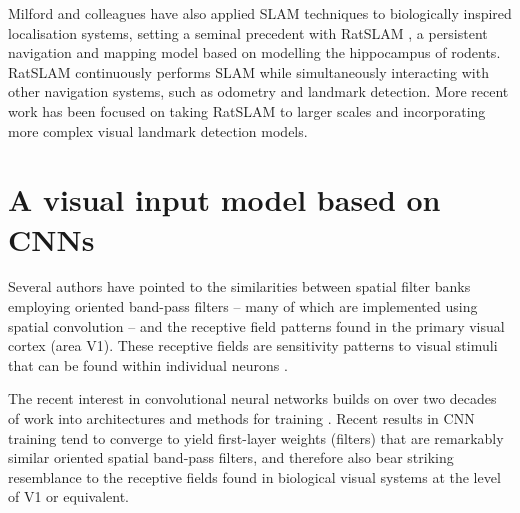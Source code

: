 Milford and colleagues have also applied SLAM techniques to biologically inspired localisation systems,  setting a seminal precedent with RatSLAM \cite{milford2004ratslam}, a persistent navigation and mapping model based on modelling the hippocampus of rodents. RatSLAM continuously performs SLAM while simultaneously interacting with other navigation systems, such as odometry and landmark detection. More recent work \cite{milford2012seqslam} has been focused on taking RatSLAM to larger scales and incorporating more complex visual landmark detection models. 


\section{A visual input model based on CNNs}
\label{sec:tensornotation}



Several authors have pointed to the similarities between spatial filter banks employing oriented band-pass filters \cite{wandell1995foundations, petrou2008next} -- many of which are implemented using spatial convolution -- and the receptive field patterns found in the primary visual cortex (area V1).  These receptive fields are sensitivity patterns to visual stimuli that can be found within individual neurons \cite{olshausen1997sparse,ringach2002spatial}. 

The recent interest in convolutional neural networks \cite{krizhevsky2012imagenet, ji20133d} builds on over two decades of work into architectures and methods for training \cite{lecun1995convolutional}. Recent results in CNN training tend to converge to yield first-layer weights (filters) that are remarkably similar oriented spatial band-pass filters, and therefore also bear striking resemblance to the receptive fields found in biological visual systems at the level of V1 or equivalent.

